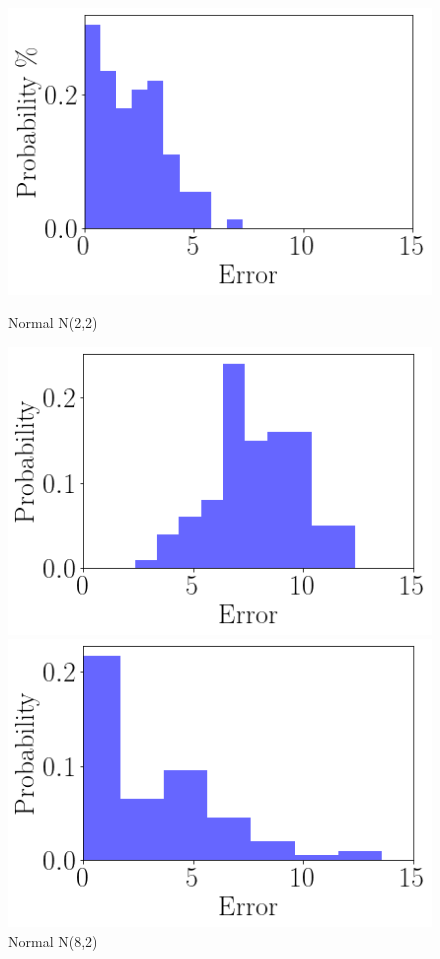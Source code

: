 \begin{figure}[ht]
\begin{minipage}[b]{0.5\linewidth}
        \includegraphics[width=\linewidth]{./img/distributions/normal_n_2_2_hist.png}
        \caption{Normal N(2,2)}
        \vspace{4ex}
    \end{minipage}%
    \begin{minipage}[b]{0.5\linewidth}
        \centering
        \includegraphics[width=\linewidth]{./img/distributions/normal_n_8_2_hist.png}
        \caption{Normal N(8,2)}
        \vspace{4ex}
    \end{minipage}
    \begin{minipage}[b]{0.5\linewidth}
        \centering
        \includegraphics[width=\linewidth]{./img/distributions/heavy_tailed_2_hist.png}

\end{minipage}
\end{figure}
